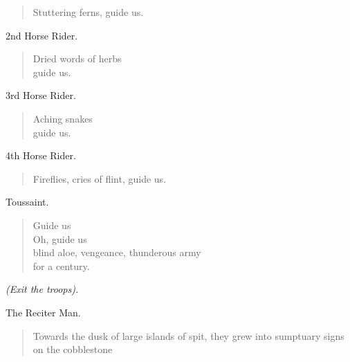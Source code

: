 \documentclass[letterpaper,article,12pt,oneside,notitlepage]{memoir}
\begin{document}
\begin{verse}
\hspace{1cm} Stuttering ferns, guide us. \\
\end{verse}

\begin{center}2nd Horse Rider.\end{center}

\begin{verse}
Dried words of herbs \\
guide us. \\
\end{verse}

\begin{center}3rd Horse Rider.\end{center}

\begin{verse}
Aching snakes \\
guide us. \\
\end{verse}

\begin{center}4th Horse Rider.\end{center}

\begin{verse}
Fireflies, cries of flint, guide us. \\
\end{verse}

\begin{center}Toussaint.\end{center}

\begin{verse}
Guide us \\
Oh, guide us \\
blind aloe, vengeance, thunderous army \\
for a century. \\
\end{verse}

\textit{(Exit the troops).}

\begin{center}The Reciter Man.\end{center}

\begin{verse}
Towards the dusk of large islands of spit, they grew into sumptuary signs on the cobblestone \\
\end{verse}

\clearpage
\end{document}
